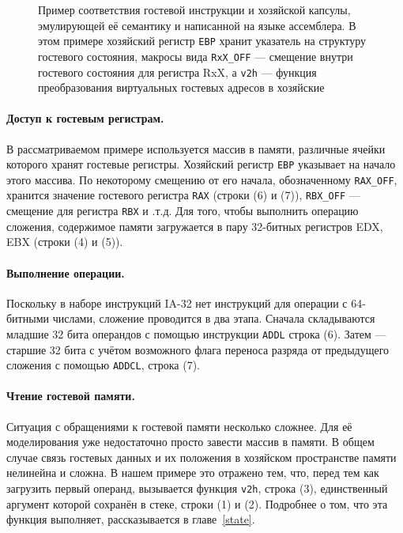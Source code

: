\begin{figure}[htb]
    \centering
    \caption[Пример соответствия гостевой инструкции и хозяйской капсулы]{Пример соответствия гостевой инструкции и хозяйской капсулы, эмулирующей её семантику и написанной на языке ассемблера. В этом примере хозяйский регистр \texttt{EBP} хранит указатель на структуру гостевого состояния, макросы вида \texttt{RxX_OFF} — смещение внутри гостевого состояния для регистра RxX, а \texttt{v2h} — функция преобразования виртуальных гостевых адресов в хозяйские}
    \label{fig:capsule}
\end{figure}

\paragraph{Доступ к гостевым регистрам.}

В рассматриваемом примере используется массив в памяти, различные ячейки которого хранят гостевые регистры. Хозяйский регистр \texttt{EBP} указывает на начало этого массива. По некоторому смещению от его начала, обозначенному \texttt{RAX_OFF}, хранится значение гостевого регистра \texttt{RAX} (строки (6) и (7)), \texttt{RBX_OFF} — смещение для регистра \texttt{RBX} и .т.д. Для того, чтобы выполнить операцию сложения, содержимое памяти загружается в пару 32-битных регистров EDX, EBX (строки (4) и (5)).

\paragraph{Выполнение операции.}
Поскольку в наборе инструкций IA-32 нет инструкций для операции с 64-битными числами, сложение проводится в два этапа. Сначала складываются младшие 32 бита операндов с помощью инструкции \texttt{ADDL} строка (6). Затем — старшие 32 бита с учётом возможного флага переноса разряда от предыдущего сложения с помощью \texttt{ADDCL}, строка (7).

\paragraph{Чтение гостевой памяти.}

Ситуация с обращениями к гостевой памяти несколько сложнее. Для её моделирования уже недостаточно просто завести массив в памяти. В общем случае связь гостевых данных и их положения в хозяйском пространстве памяти нелинейна и сложна. В нашем примере это отражено тем, что, перед тем как загрузить первый операнд, вызывается функция \texttt{v2h}, строка (3), единственный аргумент которой сохранён в стеке, строки (1) и (2). Подробнее о том, что эта функция выполняет, рассказывается в главе~\ref{state}.

